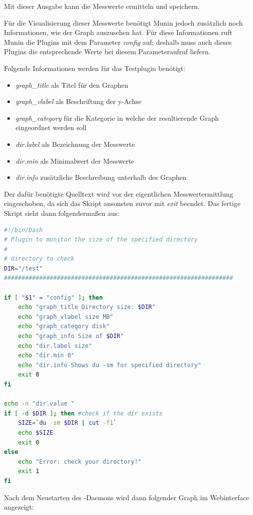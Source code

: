 Mit dieser Ausgabe kann  die Messwerte ermitteln und speichern.

Für die Visualisierung dieser Messwerte benötigt Munin jedoch zusätzlich noch Informationen, wie der Graph auszusehen hat.
Für diese Informationen ruft Munin die Plugins mit dem Parameter \textit{config} auf; deshalb muss auch dieses Plugins die entsprechende Werte bei diesem Parameteraufruf liefern.

Folgende Informationen werden für das Testplugin benötigt:

\begin{itemize}
\item \textit{graph\_title} als Titel für den Graphen
\item \textit{graph\_vlabel} als Beschriftung der y-Achse
\item \textit{graph\_category} für die Kategorie in welche der resultierende Graph eingeordnet werden soll
\item \textit{dir.label} als Bezeichnung der Messwerte
\item \textit{dir.min} als Minimalwert der Messwerte
\item \textit{dir.info} zusätzliche Beschreibung unterhalb des Graphen
\end{itemize}

Der dafür benötigte Quelltext wird vor der eigentlichen Messwertermittlung eingeschoben, da sich das Skript ansonsten zuvor mit \textit{exit} beendet.
Das fertige Skript sieht dann folgendermaßen aus:

\begin{lstlisting}[captionpos=b, caption=Fertiges Skript für den Speicherplatzbedarf eines Verzeichnisses, label=du, breaklines = true, language=bash]
#!/bin/bash
# Plugin to monitor the size of the specified directory
#
# directory to check
DIR="/test"
#################################################################

if [ "$1" = "config" ]; then
	echo "graph_title Directory size: $DIR"
	echo "graph_vlabel size MB"
	echo "graph_category disk"
	echo "graph_info Size of $DIR"
	echo "dir.label size"
	echo "dir.min 0"
	echo "dir.info Shows du -sm for specified directory"
	exit 0
fi

echo -n "dir.value "
if [ -d $DIR ]; then #check if the dir exists
    SIZE=`du -sm $DIR | cut -f1`
    echo $SIZE
    exit 0
else
    echo "Error: check your directory!"
    exit 1
fi
\end{lstlisting}

Nach dem Neustarten des -Daemons wird dann folgender Graph im Webinterface angezeigt:

